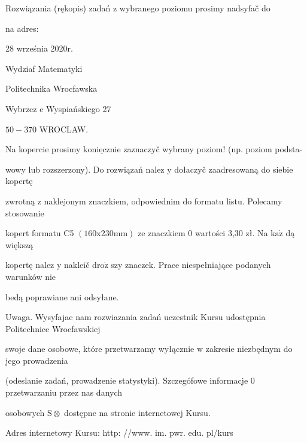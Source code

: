\documentclass[a4paper,12pt]{article}
\begin{document}
Rozwiązania (rękopis) zadań z wybranego poziomu prosimy nadsyfač do

na adres:

28 września 2020r.

Wydziaf Matematyki

Politechnika Wrocfawska

Wybrzez $\mathrm{e}$ Wyspiańskiego 27

$50-370$ WROCLAW.

Na kopercie prosimy $\underline{\mathrm{k}\mathrm{o}\mathrm{n}\mathrm{i}\mathrm{e}\mathrm{c}\mathrm{z}\mathrm{n}\mathrm{i}\mathrm{e}}$ zaznaczyč wybrany poziom! (np. poziom podsta-

wowy lub rozszerzony). Do rozwiązań nalez $\mathrm{y}$ dołaczyč zaadresowaną do siebie kopertę

zwrotną $\mathrm{z}$ naklejonym znaczkiem, odpowiednim do formatu listu. Polecamy stosowanie

kopert formatu C5 $(160\mathrm{x}230\mathrm{m}\mathrm{m})$ ze znaczkiem $0$ wartości 3,30 zł. Na $\mathrm{k}\mathrm{a}\dot{\mathrm{z}}$ dą większą

kopertę nalez $\mathrm{y}$ nakleič $\mathrm{d}\mathrm{r}\mathrm{o}\dot{\mathrm{z}}$ szy znaczek. Prace niespełniające podanych warunków nie

bedą poprawiane ani odsyłane.

Uwaga. Wysyfajac nam rozwiazania zadań uczestnik Kursu udostępnia Politechnice Wrocfawskiej

swoje dane osobowe, które przetwarzamy wyłącznie $\mathrm{w}$ zakresie niezbędnym do jego prowadzenia

(odeslanie zadań, prowadzenie statystyki). Szczegófowe informacje $0$ przetwarzaniu przez nas danych

osobowych $\mathrm{S}\otimes$ dostępne na stronie internetowej Kursu.

Adres internetowy Kursu: http: //www. im. pwr. edu. pl/kurs
\end{document}
